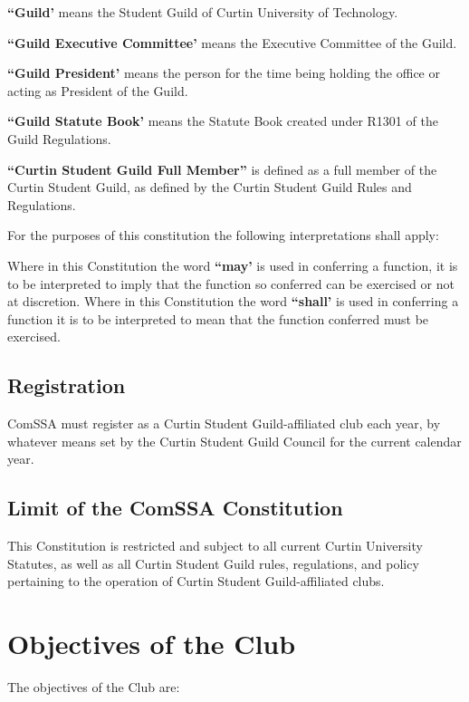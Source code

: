 \documentclass[a4paper,12pt]{article}
\begin{document}
\textbf{``Guild'} means the Student Guild of Curtin University of Technology.

\textbf{``Guild Executive Committee'} means the Executive Committee of the Guild.

\textbf{``Guild President'} means the person for the time being holding the office or acting as President of the Guild.

\textbf{``Guild Statute Book'} means the Statute Book created under R1301 of the Guild Regulations.

\textbf{``Curtin Student Guild Full Member''} is defined as a full member of the Curtin Student Guild, as defined by the Curtin Student Guild Rules and Regulations.

For the purposes of this constitution the following interpretations shall apply:

Where in this Constitution the word \textbf{``may'} is used in conferring a function, it is to be interpreted to imply that the function so conferred can be exercised or not at discretion. Where in this Constitution the word \textbf{``shall'} is used in conferring a function it is to be interpreted to mean that the function conferred must be exercised.

\subsection{Registration}

ComSSA must register as a Curtin Student Guild-affiliated club each year, by whatever means set by the Curtin Student Guild Council for the current calendar year.

\subsection{Limit of the ComSSA Constitution}

This Constitution is restricted and subject to all current Curtin University Statutes, as well as all Curtin Student Guild rules, regulations, and policy pertaining to the operation of Curtin Student Guild-affiliated clubs.

\section{Objectives of the Club}

The objectives of the Club are:
\end{document}
